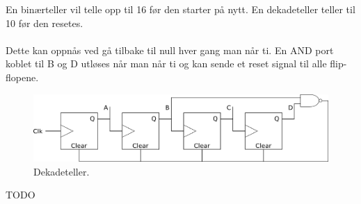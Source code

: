 En binærteller vil telle opp til 16 før den starter på nytt.
En dekadeteller teller til 10 før den resetes.
\\\\
Dette kan oppnås ved gå tilbake til null hver gang man når ti.
En AND port koblet til B og D utløses når man når ti og kan sende et
reset signal til alle flip-flopene.
\begin{figure}[H]
  \caption{Dekadeteller.}
  \centering
  \includegraphics[width=\textwidth]{./img/dekteller}
\end{figure}



TODO

